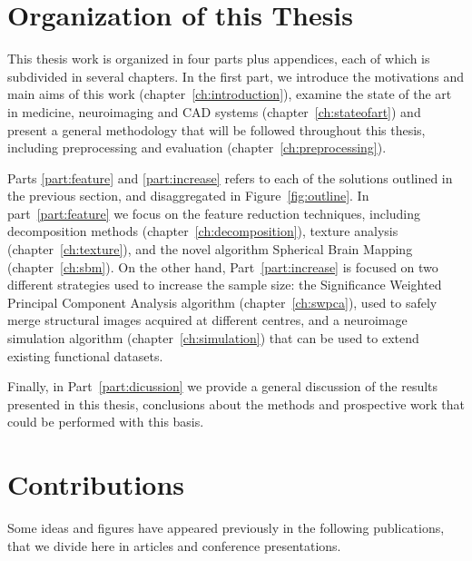 \section{Organization of this Thesis}
This thesis work is organized in four parts plus appendices, each of which is subdivided in several chapters. In the first part, we introduce the motivations and main aims of this work (chapter~\ref{ch:introduction}), examine the state of the art in medicine, neuroimaging and \ac{CAD} systems (chapter~\ref{ch:stateofart}) and present a general methodology that will be followed throughout this thesis, including preprocessing and evaluation (chapter~\ref{ch:preprocessing}). 

Parts \ref{part:feature} and \ref{part:increase} refers to each of the solutions outlined in the previous section, and disaggregated in Figure~\ref{fig:outline}. In part~\ref{part:feature} we focus on the feature reduction techniques, including decomposition methods (chapter~\ref{ch:decomposition}), texture analysis (chapter~\ref{ch:texture}), and the novel algorithm Spherical Brain Mapping (chapter~\ref{ch:sbm}). On the other hand, Part~\ref{part:increase} is focused on two different strategies used to increase the sample size: the Significance Weighted Principal Component Analysis algorithm (chapter~\ref{ch:swpca}), used to safely merge structural images acquired at different centres, and a neuroimage simulation algorithm (chapter~\ref{ch:simulation}) that can be used to extend existing functional datasets. 

Finally, in Part~\ref{part:dicussion} we provide a general discussion of the results presented in this thesis, conclusions about the methods and prospective work that could be performed with this basis. 

\section{Contributions}
Some ideas and figures have appeared previously in the following publications, that we divide here in articles and conference presentations. 


